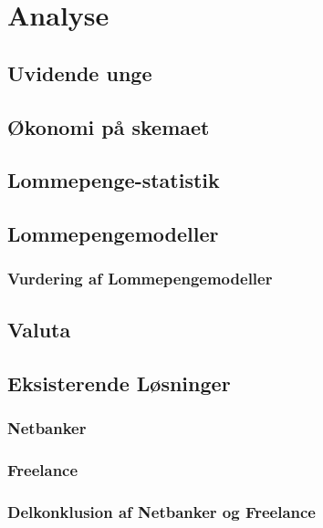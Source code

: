 \chapter{Analyse}

\section{Uvidende unge}
\label{UvidendeUnge}

\section{Økonomi på skemaet}
\label{Okonomi}

\section{Lommepenge-statistik}
\label{LommeStat}

\section{Lommepengemodeller}
\label{LommeModeller}
\subsection{Vurdering af Lommepengemodeller}
\label{ModelVurdering}

\section{Valuta}
\label{Valuta}

\section{Eksisterende Løsninger}
\subsection{Netbanker}
\subsection{Freelance}
\subsection{Delkonklusion af Netbanker og Freelance}
